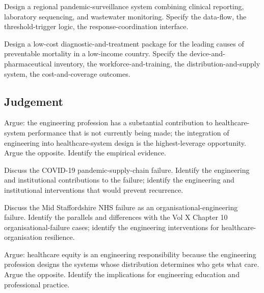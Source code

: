 \begin{exercise}
Design a regional pandemic-surveillance system combining clinical reporting, laboratory sequencing, and wastewater monitoring. Specify the data-flow, the threshold-trigger logic, the response-coordination interface.
\end{exercise}

\begin{exercise}
Design a low-cost diagnostic-and-treatment package for the leading causes of preventable mortality in a low-income country. Specify the device-and-pharmaceutical inventory, the workforce-and-training, the distribution-and-supply system, the cost-and-coverage outcomes.
\end{exercise}

\subsection*{Judgement}

\begin{exercise}
Argue: the engineering profession has a substantial contribution to healthcare-system performance that is not currently being made; the integration of engineering into healthcare-system design is the highest-leverage opportunity. Argue the opposite. Identify the empirical evidence.
\end{exercise}

\begin{exercise}
Discuss the COVID-19 pandemic-supply-chain failure. Identify the engineering and institutional contributions to the failure; identify the engineering and institutional interventions that would prevent recurrence.
\end{exercise}

\begin{exercise}
Discuss the Mid Staffordshire NHS failure as an organisational-engineering failure. Identify the parallels and differences with the Vol X Chapter 10 organisational-failure cases; identify the engineering interventions for healthcare-organisation resilience.
\end{exercise}

\begin{exercise}
Argue: healthcare equity is an engineering responsibility because the engineering profession designs the systems whose distribution determines who gets what care. Argue the opposite. Identify the implications for engineering education and professional practice.
\end{exercise}
